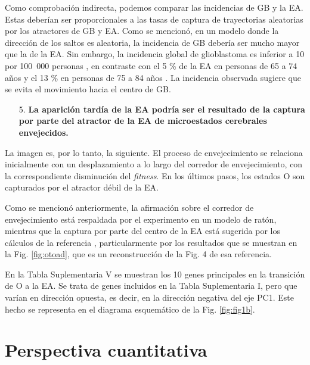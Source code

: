 Como comprobación indirecta, podemos comparar las incidencias de GB y la EA. Estas deberían ser proporcionales a las tasas de captura de trayectorias aleatorias por los atractores de GB y EA. Como se mencionó, en un modelo donde la dirección de los saltos es aleatoria, la incidencia de GB debería ser mucho mayor que la de la EA. Sin embargo, la incidencia global de glioblastoma es inferior a 10 por 100 000 personas \cite{Ohgaki2005}, en contraste con el 5 \% de la EA en personas de 65 a 74 años y el 13 \% en personas de 75 a 84 años \cite{alz2023}. La incidencia observada sugiere que se evita el movimiento hacia el centro de GB.

\begin{enumerate}
	\item[5.] \textbf{La aparición tardía de la EA podría ser el resultado de la captura por parte del atractor de la EA de microestados cerebrales envejecidos.}
\end{enumerate}

La imagen es, por lo tanto, la siguiente. El proceso de envejecimiento se relaciona inicialmente con un desplazamiento a lo largo del corredor de envejecimiento, con la correspondiente disminución del \textit{fitness}. En los últimos pasos, los estados O son capturados por el atractor débil de la EA.

Como se mencionó anteriormente, la afirmación sobre el corredor de envejecimiento está respaldada por el experimento en un modelo de ratón, mientras que la captura por parte del centro de la EA está sugerida por los cálculos de la referencia \cite{Gonzalez_2021}, particularmente por los resultados que se muestran en la Fig. \ref{fig:otoad}, que es un reconstrucción de la Fig. 4 de esa referencia.

\alert{En la Tabla Suplementaria V} se muestran los 10 genes principales en la transición de O a la EA. Se trata de genes incluidos en la \alert{Tabla Suplementaria I}, pero que varían en dirección opuesta, es decir, en la dirección negativa del eje PC1. Este hecho se representa en el diagrama esquemático de la Fig. \ref{fig:fig1b}.


\section{Perspectiva cuantitativa}

